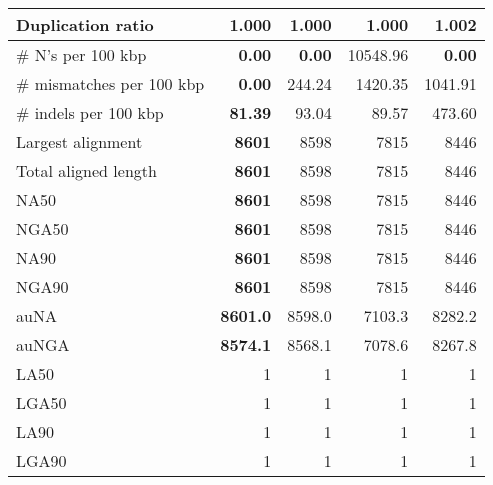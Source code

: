 \documentclass[12pt,a4paper]{article}
\begin{document}
\begin{table}[ht]
\begin{center}
\begin{tabular}{|l*{4}{|r}|}
Duplication ratio & {\bf 1.000} & {\bf 1.000} & {\bf 1.000} & 1.002 \\ \hline
\# N's per 100 kbp & {\bf 0.00} & {\bf 0.00} & 10548.96 & {\bf 0.00} \\ \hline
\# mismatches per 100 kbp & {\bf 0.00} & 244.24 & 1420.35 & 1041.91 \\ \hline
\# indels per 100 kbp & {\bf 81.39} & 93.04 & 89.57 & 473.60 \\ \hline
Largest alignment & {\bf 8601} & 8598 & 7815 & 8446 \\ \hline
Total aligned length & {\bf 8601} & 8598 & 7815 & 8446 \\ \hline
NA50 & {\bf 8601} & 8598 & 7815 & 8446 \\ \hline
NGA50 & {\bf 8601} & 8598 & 7815 & 8446 \\ \hline
NA90 & {\bf 8601} & 8598 & 7815 & 8446 \\ \hline
NGA90 & {\bf 8601} & 8598 & 7815 & 8446 \\ \hline
auNA & {\bf 8601.0} & 8598.0 & 7103.3 & 8282.2 \\ \hline
auNGA & {\bf 8574.1} & 8568.1 & 7078.6 & 8267.8 \\ \hline
LA50 & 1 & 1 & 1 & 1 \\ \hline
LGA50 & 1 & 1 & 1 & 1 \\ \hline
LA90 & 1 & 1 & 1 & 1 \\ \hline
LGA90 & 1 & 1 & 1 & 1 \\ \hline
\end{tabular}
\end{center}
\end{table}
\end{document}
